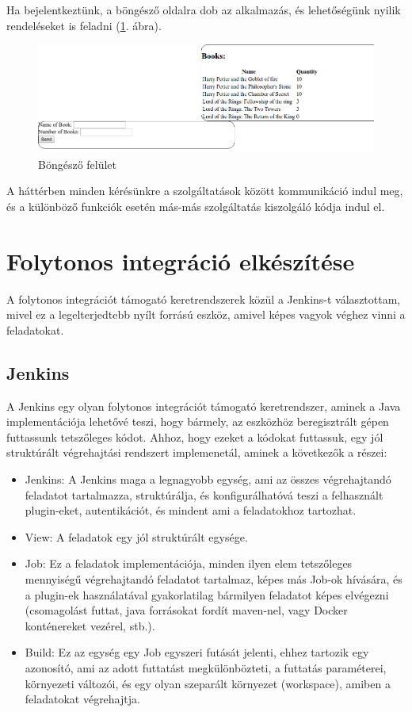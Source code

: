 \documentclass[11pt,magyar,a4paper,twoside,]{report}
\providecommand{\tightlist}{%
  \setlength{\itemsep}{0pt}\setlength{\parskip}{0pt}}
\let\Oldincludegraphics\includegraphics
\renewcommand{\includegraphics}[1]{
\begin{adjustbox}{max size={\textwidth}{\textheight}}
    \Oldincludegraphics[scale=0.6]{#1}%
\end{adjustbox}
}
\begin{document}
Ha bejelentkeztünk, a böngésző oldalra dob az alkalmazás, és
lehetőségünk nyilik rendeléseket is feladni (\ref{browse}. ábra).

\begin{figure}[H]
\centering
\includegraphics{img/browsescreen.png}
\caption{Böngésző felület\label{browse}}
\end{figure}

A háttérben minden kérésünkre a szolgáltatások között kommunikáció indul
meg, és a különböző funkciók esetén más-más szolgáltatás kiszolgáló
kódja indul el.

\section{Folytonos integráció
elkészítése}\label{folytonos-integruxe1ciuxf3-elkuxe9szuxedtuxe9se}

A folytonos integrációt támogató keretrendszerek közül a Jenkins-t
választottam, mivel ez a legelterjedtebb nyílt forrású eszköz, amivel
képes vagyok véghez vinni a feladatokat.

\subsection{Jenkins}\label{jenkins}

A Jenkins egy olyan folytonos integrációt támogató keretrendszer, aminek
a Java implementációja lehetővé teszi, hogy bármely, az eszközhöz
beregisztrált gépen futtassunk tetszőleges kódot. Ahhoz, hogy ezeket a
kódokat futtassuk, egy jól struktúrált végrehajtási rendszert
implemenetál, aminek a következők a részei:

\begin{itemize}
\tightlist
\item
  Jenkins: A Jenkins maga a legnagyobb egység, ami az összes
  végrehajtandó feladatot tartalmazza, struktúrálja, és konfigurálhatóvá
  teszi a felhasznált plugin-eket, autentikációt, és mindent ami a
  feladatokhoz tartozhat.
\item
  View: A feladatok egy jól struktúrált egysége.
\item
  Job: Ez a feladatok implementációja, minden ilyen elem tetszőleges
  mennyiségű végrehajtandó feladatot tartalmaz, képes más Job-ok
  hívására, és a plugin-ek használatával gyakorlatilag bármilyen
  feladatot képes elvégezni (csomagolást futtat, java forrásokat fordít
  maven-nel, vagy Docker konténereket vezérel, stb.).
\item
  Build: Ez az egység egy Job egyszeri futását jelenti, ehhez tartozik
  egy azonosító, ami az adott futtatást megkülönbözteti, a futtatás
  paraméterei, környezeti változói, és egy olyan szeparált környezet
  (workspace), amiben a feladatokat végrehajtja.
\end{itemize}
\end{document}
